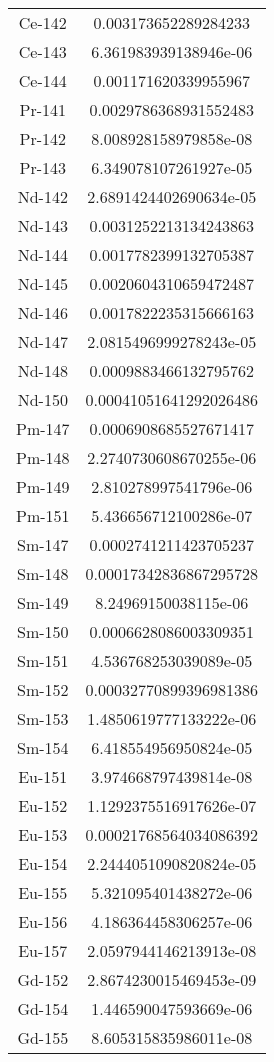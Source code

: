\begin{table}[h!]
\begin{tabular}{|| c || c |}
Ce-142 & 0.003173652289284233 \\
Ce-143 & 6.361983939138946e-06 \\
Ce-144 & 0.001171620339955967 \\
Pr-141 & 0.0029786368931552483 \\
Pr-142 & 8.008928158979858e-08 \\
Pr-143 & 6.349078107261927e-05 \\
Nd-142 & 2.6891424402690634e-05 \\
Nd-143 & 0.0031252213134243863 \\
Nd-144 & 0.0017782399132705387 \\
Nd-145 & 0.0020604310659472487 \\
Nd-146 & 0.0017822235315666163 \\
Nd-147 & 2.0815496999278243e-05 \\
Nd-148 & 0.0009883466132795762 \\
Nd-150 & 0.00041051641292026486 \\
Pm-147 & 0.0006908685527671417 \\
Pm-148 & 2.2740730608670255e-06 \\
Pm-149 & 2.810278997541796e-06 \\
Pm-151 & 5.436656712100286e-07 \\
Sm-147 & 0.0002741211423705237 \\
Sm-148 & 0.00017342836867295728 \\
Sm-149 & 8.24969150038115e-06 \\
Sm-150 & 0.0006628086003309351 \\
Sm-151 & 4.536768253039089e-05 \\
Sm-152 & 0.00032770899396981386 \\
Sm-153 & 1.4850619777133222e-06 \\
Sm-154 & 6.418554956950824e-05 \\
Eu-151 & 3.974668797439814e-08 \\
Eu-152 & 1.1292375516917626e-07 \\
Eu-153 & 0.00021768564034086392 \\
Eu-154 & 2.2444051090820824e-05 \\
Eu-155 & 5.321095401438272e-06 \\
Eu-156 & 4.186364458306257e-06 \\
Eu-157 & 2.0597944146213913e-08 \\
Gd-152 & 2.8674230015469453e-09 \\
Gd-154 & 1.446590047593669e-06 \\
Gd-155 & 8.605315835986011e-08 \\

\end{tabular}
\end{table}

